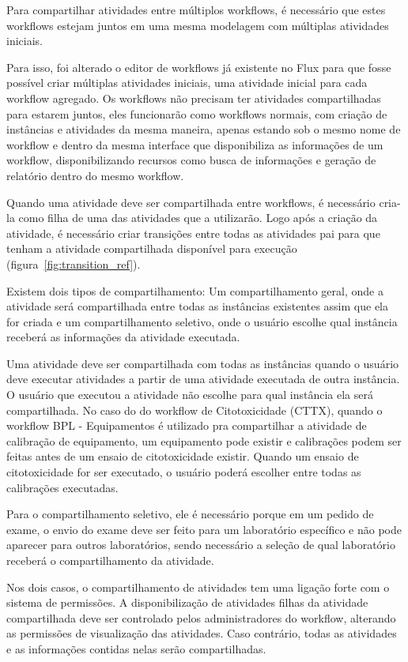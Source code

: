Para compartilhar atividades entre múltiplos workflows, é necessário que estes workflows estejam juntos em uma mesma modelagem com múltiplas atividades iniciais.

Para isso, foi alterado o editor de workflows já existente no Flux para que fosse possível criar múltiplas atividades iniciais, uma atividade inicial para cada workflow agregado.
Os workflows não precisam ter atividades compartilhadas para estarem juntos, eles funcionarão como workflows normais, com criação de instâncias e atividades da mesma maneira, apenas estando sob o mesmo nome de workflow e dentro da mesma interface que disponibiliza as informações de um workflow, disponibilizando recursos como busca de informações e geração de relatório dentro do mesmo workflow.

Quando uma atividade deve ser compartilhada entre workflows, é necessário cria-la como filha de uma das atividades que a utilizarão. Logo após a criação da atividade, é necessário criar transições entre todas as atividades pai para que tenham a atividade compartilhada disponível para execução (figura~\ref{fig:transition_ref}).

Existem dois tipos de compartilhamento: Um compartilhamento geral, onde a atividade será compartilhada entre todas as instâncias existentes assim que ela for criada e um compartilhamento seletivo, onde o usuário escolhe qual instância receberá as informações da atividade executada.

Uma atividade deve ser compartilhada com todas as instâncias quando o usuário deve executar atividades a partir de uma atividade executada de outra instância. O usuário que executou a atividade não escolhe para qual instância ela será compartilhada. No caso do do workflow de Citotoxicidade (CTTX), quando o workflow BPL - Equipamentos é utilizado pra compartilhar a atividade de calibração de equipamento, um equipamento pode existir e calibrações podem ser feitas antes de um ensaio de citotoxicidade existir. Quando um ensaio de citotoxicidade for ser executado, o usuário poderá escolher entre todas as calibrações executadas.

Para o compartilhamento seletivo, ele é necessário porque em um pedido de exame, o envio do exame deve ser feito para um laboratório específico e não pode aparecer para outros laboratórios, sendo necessário a seleção de qual laboratório receberá o compartilhamento da atividade.

Nos dois casos, o compartilhamento de atividades tem uma ligação forte com o sistema de permissões. A disponibilização de atividades filhas da atividade compartilhada deve ser controlado pelos administradores do workflow, alterando as permissões de visualização das atividades. Caso contrário, todas as atividades e as informações contidas nelas serão compartilhadas.


